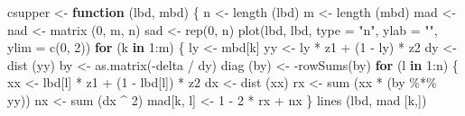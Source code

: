 \documentclass[
  12pt,
]{book}
\newenvironment{Shaded}{\begin{snugshade}}{\end{snugshade}}
\newcommand{\AttributeTok}[1]{\textcolor[rgb]{0.77,0.63,0.00}{#1}}
\newcommand{\ControlFlowTok}[1]{\textcolor[rgb]{0.13,0.29,0.53}{\textbf{#1}}}
\newcommand{\DecValTok}[1]{\textcolor[rgb]{0.00,0.00,0.81}{#1}}
\newcommand{\FunctionTok}[1]{\textcolor[rgb]{0.00,0.00,0.00}{#1}}
\newcommand{\NormalTok}[1]{#1}
\newcommand{\OtherTok}[1]{\textcolor[rgb]{0.56,0.35,0.01}{#1}}
\newcommand{\SpecialCharTok}[1]{\textcolor[rgb]{0.00,0.00,0.00}{#1}}
\newcommand{\StringTok}[1]{\textcolor[rgb]{0.31,0.60,0.02}{#1}}
\theoremstyle{definition}
\theoremstyle{definition}
\theoremstyle{definition}
\theoremstyle{definition}
\theoremstyle{remark}
\begin{document}
\begin{Shaded}
\begin{Highlighting}[]
\NormalTok{csupper }\OtherTok{\textless{}{-}} \ControlFlowTok{function}\NormalTok{ (lbd, mbd) \{}
\NormalTok{  n }\OtherTok{\textless{}{-}} \FunctionTok{length}\NormalTok{ (lbd)}
\NormalTok{  m }\OtherTok{\textless{}{-}} \FunctionTok{length}\NormalTok{ (mbd)}
\NormalTok{  mad }\OtherTok{\textless{}{-}}\NormalTok{ nad }\OtherTok{\textless{}{-}} \FunctionTok{matrix}\NormalTok{ (}\DecValTok{0}\NormalTok{, m, n)}
\NormalTok{  sad }\OtherTok{\textless{}{-}} \FunctionTok{rep}\NormalTok{(}\DecValTok{0}\NormalTok{, n)}
  \FunctionTok{plot}\NormalTok{(lbd,}
\NormalTok{       lbd,}
       \AttributeTok{type =} \StringTok{"n"}\NormalTok{,}
       \AttributeTok{ylab =} \StringTok{""}\NormalTok{,}
       \AttributeTok{ylim =} \FunctionTok{c}\NormalTok{(}\DecValTok{0}\NormalTok{, }\DecValTok{2}\NormalTok{))}
  \ControlFlowTok{for}\NormalTok{ (k }\ControlFlowTok{in} \DecValTok{1}\SpecialCharTok{:}\NormalTok{m) \{}
\NormalTok{    ly }\OtherTok{\textless{}{-}}\NormalTok{ mbd[k]}
\NormalTok{    yy }\OtherTok{\textless{}{-}}\NormalTok{ ly }\SpecialCharTok{*}\NormalTok{ z1 }\SpecialCharTok{+}\NormalTok{ (}\DecValTok{1} \SpecialCharTok{{-}}\NormalTok{ ly) }\SpecialCharTok{*}\NormalTok{ z2}
\NormalTok{    dy }\OtherTok{\textless{}{-}} \FunctionTok{dist}\NormalTok{ (yy)}
\NormalTok{    by }\OtherTok{\textless{}{-}} \FunctionTok{as.matrix}\NormalTok{(}\SpecialCharTok{{-}}\NormalTok{delta }\SpecialCharTok{/}\NormalTok{ dy)}
    \FunctionTok{diag}\NormalTok{ (by) }\OtherTok{\textless{}{-}} \SpecialCharTok{{-}}\FunctionTok{rowSums}\NormalTok{(by)}
    \ControlFlowTok{for}\NormalTok{ (l }\ControlFlowTok{in} \DecValTok{1}\SpecialCharTok{:}\NormalTok{n) \{}
\NormalTok{      xx }\OtherTok{\textless{}{-}}\NormalTok{ lbd[l] }\SpecialCharTok{*}\NormalTok{ z1 }\SpecialCharTok{+}\NormalTok{ (}\DecValTok{1} \SpecialCharTok{{-}}\NormalTok{ lbd[l]) }\SpecialCharTok{*}\NormalTok{ z2}
\NormalTok{      dx }\OtherTok{\textless{}{-}} \FunctionTok{dist}\NormalTok{ (xx)}
\NormalTok{      rx }\OtherTok{\textless{}{-}} \FunctionTok{sum}\NormalTok{ (xx }\SpecialCharTok{*}\NormalTok{ (by }\SpecialCharTok{\%*\%}\NormalTok{ yy))}
\NormalTok{      nx }\OtherTok{\textless{}{-}} \FunctionTok{sum}\NormalTok{ (dx }\SpecialCharTok{\^{}} \DecValTok{2}\NormalTok{)}
\NormalTok{      mad[k, l] }\OtherTok{\textless{}{-}} \DecValTok{1} \SpecialCharTok{{-}} \DecValTok{2} \SpecialCharTok{*}\NormalTok{ rx }\SpecialCharTok{+}\NormalTok{ nx}
\NormalTok{    \}}
    \FunctionTok{lines}\NormalTok{ (lbd, mad [k,])}

\end{Highlighting}
\end{Shaded}
\end{document}
